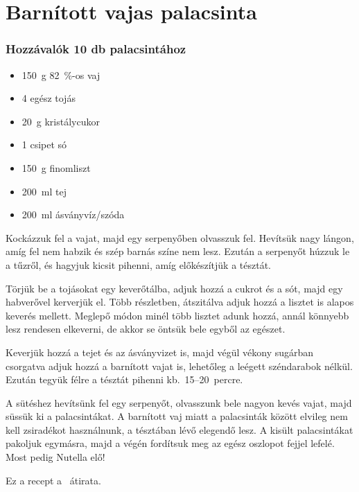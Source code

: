 \newpage
\section*{Barnított vajas palacsinta} \label{sec:barnitott-vajas-palacsinta}

\subsubsection*{Hozzávalók 10 db palacsintához}
\begin{itemize}
    \item \qty{150}{\g} \qty{82}{\percent}-os vaj
    \item \num{4} egész tojás
    \item \qty{20}{\g} kristálycukor
    \item \num{1} csipet só
    \item \qty{150}{\g} finomliszt
    \item \qty{200}{\ml} tej
    \item \qty{200}{\ml} ásványvíz/szóda
\end{itemize}

Kockázzuk fel a vajat, majd egy serpenyőben olvasszuk fel. Hevítsük nagy lángon, amíg fel nem habzik és szép barnás színe nem lesz. Ezután a serpenyőt húzzuk le a tűzről, és hagyjuk kicsit pihenni, amíg előkészítjük a tésztát.

Törjük be a tojásokat egy keverőtálba, adjuk hozzá a cukrot és a sót, majd egy habverővel kerverjük el. Több részletben, átszitálva adjuk hozzá a lisztet is alapos keverés mellett. Meglepő módon minél több lisztet adunk hozzá, annál könnyebb lesz rendesen elkeverni, de akkor se öntsük bele egyből az egészet.

Keverjük hozzá a tejet és az ásványvizet is, majd végül vékony sugárban csorgatva adjuk hozzá a barnított vajat is, lehetőleg a leégett széndarabok nélkül. Ezután tegyük félre a tésztát pihenni kb.~\numrange{15}{20}~percre.

A sütéshez hevítsünk fel egy serpenyőt, olvasszunk bele nagyon kevés vajat, majd süssük ki a palacsintákat. A barnított vaj miatt a palacsinták között elvileg nem kell zsiradékot használnunk, a tésztában lévő elegendő lesz. A kisült palacsintákat pakoljuk egymásra, majd a végén fordítsuk meg az egész oszlopot fejjel lefelé. Most pedig Nutella elő!

Ez a recept a~\cite{szell_palacsinta} átirata.

